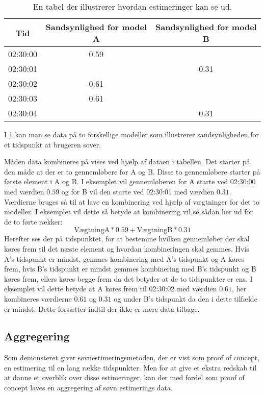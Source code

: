 \begin{table}[h]
\centering
\begin{tabular}{|c|c|c|}
\hline Tid & Sandsynlighed for model A & Sandsynlighed for model B \\ 
\hline 02:30:00 & 	0.59     & \nv \\ 
\hline 02:30:01 & 	\nv     & 0.31 \\ 
\hline 02:30:02 & 	0.61    & \nv \\ 
\hline 02:30:03 & 	0.61    & \nv \\ 
\hline 02:30:04 & 	\nv     & 0.31 \\ 
\hline 
\end{tabular} 
\caption{En tabel der illustrerer hvordan estimeringer kan se ud.}
\label{tab:combiModelsExample}
\end{table}

I \cref{tab:combiModelsExample} kan man se data på to forskellige modeller som illustrerer sandsynligheden for et tidspunkt at brugeren sover.

Måden data kombineres på vises ved hjælp af dataen i tabellen.
Det starter på den måde at der er to gennemløbere for A og B. 
Disse to gennemløbere starter på første element i A og B. 
I eksemplet vil gennemløberen for A starte ved 02:30:00 med værdien $0.59$ og for B vil den starte ved 02:30:01 med værdien $0.31$.
Værdierne bruges så til at lave en kombinering ved hjælp af vægtninger for det to modeller. I eksemplet vil dette så betyde at kombinering vil se sådan her ud for de to førte rækker: $$\text{VægtningA} * 0.59 + \text{VægtningB} * 0.31$$
Herefter ses der på tidspunktet, for at bestemme hvilken gennemløber der skal køres frem til det næste element og hvordan kombineringen skal gemmes.
Hvis A's tidspunkt er mindst, gemmes kombinering med A's tidspunkt og A køres frem, hvis B's tidspunkt er mindst gemmes kombinering med B's tidspunkt og B køres frem, ellers køres begge frem da det betyder at de to tidspunkter er ens.
I eksemplet vil dette betyde at A køres frem til 02:30:02 med værdien $0.61$, her kombineres værdierne $0.61$ og $0.31$ og under B's tidspunkt da den i dette tilfælde er mindst.
Dette forsætter indtil der ikke er mere data tilbage.

\subsection{Aggregering}\label{subsec:soevnaggre}
Som demonsteret giver søvnestimeringsmetoden, der er vist som proof of concept, en estimering til en lang række tidspunkter.
Men for at give et ekstra redskab til at danne et overblik over disse estimeringer, kan der med fordel som proof of concept laves en aggregering af søvn estimerings data.

